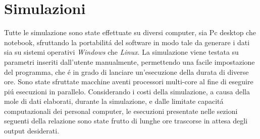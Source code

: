 \chapter{Simulazioni}
Tutte le simulazione sono state effettuate su diversi computer, sia Pc desktop che notebook, sfruttando la portabilit\'a del software in modo tale da generare i dati sia su sistemi operativi \textit{Windows} che \textit{Linux}. La simulazione viene testata  su parametri inseriti dall'utente manualmente, permettendo una facile impostazione del programma, che \'e in grado di lanciare un'esecuzione della durata di diverse ore.
Sono state sfruttate  macchine aventi processori multi-core al fine di eseguire pi\'u esecuzioni in parallelo.
Considerando i costi della simulazione, a causa della mole di dati elaborati, durante la simulazione, e dalle limitate capacit\'a computazionali dei personal computer, le esecuzioni presentate nelle sezioni seguenti della relazione sono state frutto di lunghe ore trascorse in attesa degli output desiderati.

